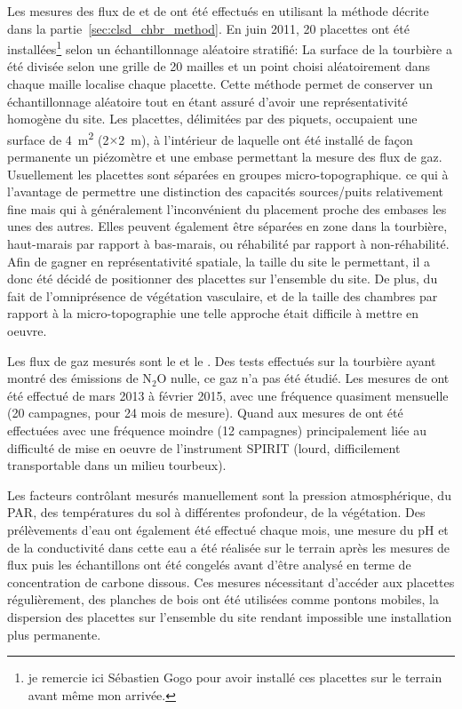 Les mesures des flux de \coo et de \chh ont été effectués en utilisant la méthode décrite dans la partie~\ref{sec:clsd_chbr_method}.
En juin 2011, 20 placettes ont été installées\footnote{je remercie ici Sébastien Gogo pour avoir installé ces placettes sur le terrain avant même mon arrivée.} selon un échantillonnage aléatoire stratifié:
La surface de la tourbière a été divisée selon une grille de 20 mailles et un point choisi aléatoirement dans chaque maille localise chaque placette.
Cette méthode permet de conserver un échantillonnage aléatoire tout en étant assuré d'avoir une représentativité homogène du site. 
Les placettes, délimitées par des piquets, occupaient une surface de \SI{4}{\square\metre} (2$\times$\SI{2}{\metre}), à l'intérieur de laquelle ont été installé de façon permanente un piézomètre et une embase permettant la mesure des flux de gaz.
Usuellement les placettes sont séparées en groupes micro-topographique. ce qui à l'avantage de permettre une distinction des capacités sources/puits relativement fine mais qui à généralement l'inconvénient du placement proche des embases les unes des autres.
Elles peuvent également être séparées en zone dans la tourbière, haut-marais par rapport à bas-marais, ou réhabilité par rapport à non-réhabilité.
Afin de gagner en représentativité spatiale, la taille du site le permettant, il a donc été décidé de positionner des placettes sur l'ensemble du site.
De plus, du fait de l'omniprésence de végétation vasculaire, et de la taille des chambres par rapport à la micro-topographie une telle approche était difficile à mettre en oeuvre.

Les flux de gaz mesurés sont le \coo et le \chh.
Des tests effectués sur la tourbière ayant montré des émissions de N$_{2}$O nulle, ce gaz n'a pas été étudié.
Les mesures de \coo ont été effectué de mars 2013 à février 2015, avec une fréquence quasiment mensuelle (20 campagnes, pour 24 mois de mesure). Quand aux mesures de \chh ont été effectuées avec une fréquence moindre (12 campagnes) principalement liée au difficulté de mise en oeuvre de l'instrument SPIRIT (lourd, difficilement transportable dans un milieu tourbeux).



Les facteurs contrôlant mesurés manuellement sont la pression atmosphérique, du PAR, des températures du sol à différentes profondeur, de la végétation.
Des prélèvements d'eau ont également été effectué chaque mois, une mesure du pH et de la conductivité dans cette eau a été réalisée sur le terrain après les mesures de flux puis les échantillons ont été congelés avant d'être analysé en terme de concentration de carbone dissous.
Ces mesures nécessitant d'accéder aux placettes régulièrement, des planches de bois ont été utilisées comme pontons mobiles, la dispersion des placettes sur l'ensemble du site rendant impossible une installation plus permanente.

